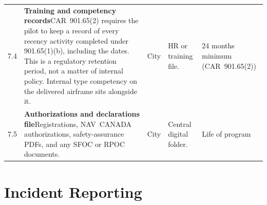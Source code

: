 \documentclass[11pt,letterpaper]{article}
\newcommand{\itemrule}{\arrayrulecolor{uavrule}\midrule\arrayrulecolor{black}}
\newcommand{\reqcell}[2]{\textbf{#1}\newline\small\color{uavgrey}#2}
\begin{document}
\begin{longtable}{@{}L{0.28in} L{2.20in} L{0.85in} L{1.95in} L{0.85in}@{}}
7.4 &
\reqcell{Training and competency records}{CAR~901.65(2) requires the pilot to keep a record of every recency activity completed under 901.65(1)(b), including the dates. This is a regulatory retention period, not a matter of internal policy. Internal type competency on the delivered airframe sits alongside it.} &
City & HR or training file. & 24 months minimum (CAR~901.65(2)) \\ \itemrule

7.5 &
\reqcell{Authorizations and declarations file}{Registrations, NAV~CANADA authorizations, safety-assurance PDFs, and any SFOC or RPOC documents.} &
City & Central digital folder. & Life of program \\

\end{longtable}

\section{Incident Reporting}
\end{document}
